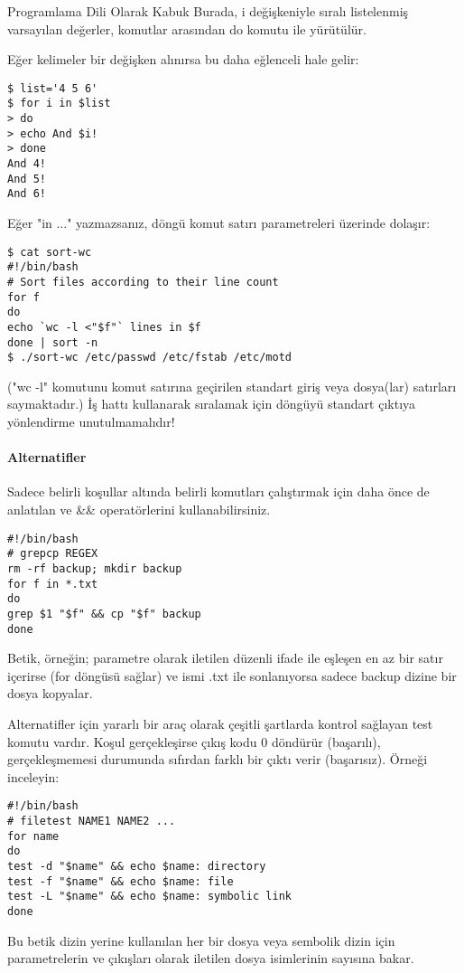 \begin{section}{Programlama Dili Olarak Kabuk}
Burada, i değişkeniyle sıralı listelenmiş varsayılan değerler, komutlar arasından do komutu ile yürütülür.

Eğer kelimeler bir değişken alınırsa bu daha eğlenceli hale gelir:
\begin{verbatim}
$ list='4 5 6'
$ for i in $list
> do
> echo And $i!
> done
And 4!
And 5!
And 6!
\end{verbatim}

Eğer "in ..." yazmazsanız, döngü komut satırı parametreleri üzerinde dolaşır:
\begin{verbatim}
$ cat sort-wc
#!/bin/bash
# Sort files according to their line count
for f
do
echo `wc -l <"$f"` lines in $f
done | sort -n
$ ./sort-wc /etc/passwd /etc/fstab /etc/motd
\end{verbatim}

("wc -l" komutunu komut satırına geçirilen standart giriş veya dosya(lar) satırları saymaktadır.) İş hattı kullanarak sıralamak için döngüyü standart çıktıya yönlendirme unutulmamalıdır!

\paragraph{Alternatifler}{ Sadece belirli koşullar altında belirli komutları çalıştırmak için daha önce de anlatılan \textbar \textbar ve \&\& operatörlerini kullanabilirsiniz.
\begin{verbatim}
#!/bin/bash
# grepcp REGEX
rm -rf backup; mkdir backup
for f in *.txt
do
grep $1 "$f" && cp "$f" backup
done
\end{verbatim}
}

Betik, örneğin; parametre olarak iletilen düzenli ifade ile eşleşen en az bir satır içerirse (for döngüsü sağlar) ve ismi .txt ile sonlanıyorsa sadece backup dizine bir dosya kopyalar.

Alternatifler için yararlı bir araç olarak çeşitli şartlarda kontrol sağlayan test komutu vardır. Koşul gerçekleşirse çıkış kodu 0 döndürür (başarılı), gerçekleşmemesi durumunda sıfırdan farklı bir çıktı verir (başarısız). Örneği inceleyin:
\begin{verbatim}
#!/bin/bash
# filetest NAME1 NAME2 ...
for name
do
test -d "$name" && echo $name: directory
test -f "$name" && echo $name: file
test -L "$name" && echo $name: symbolic link
done
\end{verbatim}

Bu betik dizin yerine kullanılan her bir dosya veya sembolik dizin için parametrelerin ve çıkışları olarak iletilen dosya isimlerinin sayısına bakar.


\end{section}
